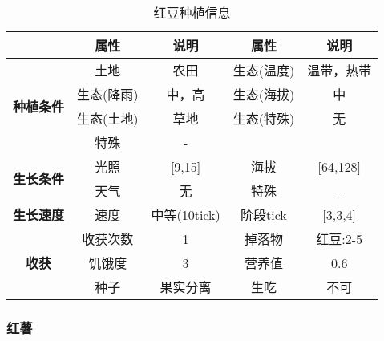 \begin{table}[H]
    \centering
    \caption{红豆种植信息}
    \label{table:红豆种植信息}
    \setlength{\tabcolsep}{4mm}
    \begin{tabular}{c|cc|cc}
        \toprule
                                           & \textbf{属性} & \textbf{说明}   & \textbf{属性} & \textbf{说明} \\
        \midrule
        \multirow{4}{*}{\textbf{种植条件}} & 土地          & 农田            & 生态(温度)    & 温带，热带    \\
                                           & 生态(降雨)    & 中，高          & 生态(海拔)    & 中            \\
                                           & 生态(土地)    & 草地            & 生态(特殊)    & 无            \\
                                           & 特殊          & -                                 \\
        \midrule
        \multirow{2}{*}{\textbf{生长条件}} & 光照          & [9,15]         & 海拔          & [64,128]      \\
                                           & 天气          & 无              & 特殊          & -      \\
        \midrule
        \textbf{生长速度}                  & 速度          & 中等(10tick)       & 阶段tick      & [3,3,4]       \\
        \midrule
        \multirow{3}{*}{\textbf{收获}}     & 收获次数      & 1               & 掉落物        & 红豆:2-5      \\
                                           & 饥饿度        & 3               & 营养值        & 0.6           \\
                                           & 种子          & 果实分离        & 生吃          & 不可          \\
        \bottomrule
    \end{tabular}
\end{table}

\subsubsection{红薯}

